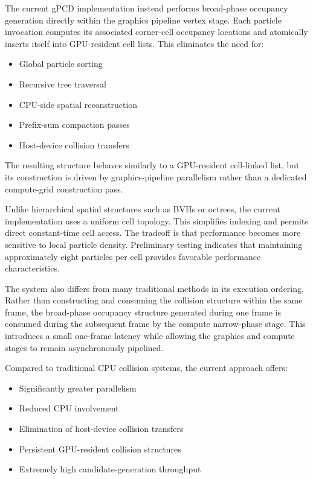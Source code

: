 \documentclass{article}
\begin{document}
The current gPCD implementation instead performs broad-phase occupancy generation directly within the graphics pipeline vertex stage. Each particle invocation computes its associated corner-cell occupancy locations and atomically inserts itself into GPU-resident cell lists. This eliminates the need for:

\begin{itemize}
    \item Global particle sorting
    \item Recursive tree traversal
    \item CPU-side spatial reconstruction
    \item Prefix-sum compaction passes
    \item Host-device collision transfers
\end{itemize}

The resulting structure behaves similarly to a GPU-resident cell-linked list, but its construction is driven by graphics-pipeline parallelism rather than a dedicated compute-grid construction pass.

Unlike hierarchical spatial structures such as BVHs or octrees, the current implementation uses a uniform cell topology. This simplifies indexing and permits direct constant-time cell access. The tradeoff is that performance becomes more sensitive to local particle density. Preliminary testing indicates that maintaining approximately eight particles per cell provides favorable performance characteristics.

The system also differs from many traditional methods in its execution ordering. Rather than constructing and consuming the collision structure within the same frame, the broad-phase occupancy structure generated during one frame is consumed during the subsequent frame by the compute narrow-phase stage. This introduces a small one-frame latency while allowing the graphics and compute stages to remain asynchronously pipelined.

Compared to traditional CPU collision systems, the current approach offers:

\begin{itemize}
    \item Significantly greater parallelism
    \item Reduced CPU involvement
    \item Elimination of host-device collision transfers
    \item Persistent GPU-resident collision structures
    \item Extremely high candidate-generation throughput
\end{itemize}
\end{document}
